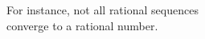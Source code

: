 \documentclass[preview]{standalone}
\begin{document}
\begin{center}
For instance, not all rational sequences\\converge to a rational number.
\end{center}
\end{document}

